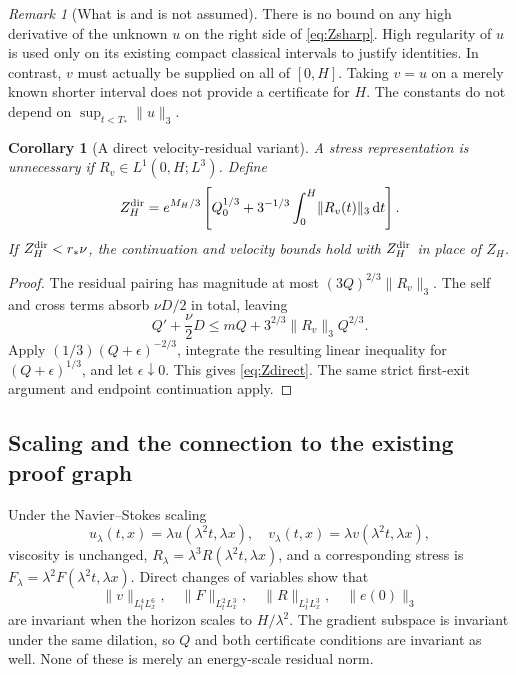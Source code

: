 \documentclass[11pt,a4paper]{article}
\newtheorem{corollary}[theorem]{Corollary}
\theoremstyle{definition}\newtheorem{definition}[theorem]{Definition}
\theoremstyle{remark}\newtheorem{remark}[theorem]{Remark}
\newcommand{\dd}{\,\mathrm d}
\newcommand{\norm}[1]{\lVert #1\rVert}
\newcommand{\rstar}{r_*}
\numberwithin{equation}{section}
\begin{document}
\begin{remark}[What is and is not assumed]
There is no bound on any high derivative of the unknown $u$ on the right side of \eqref{eq:Zsharp}. High regularity of $u$ is used only on its existing compact classical intervals to justify identities. In contrast, $v$ must actually be supplied on all of $[0,H]$. Taking $v=u$ on a merely known shorter interval does not provide a certificate for $H$. The constants do not depend on $\sup_{t<T_*}\norm u_3$.
\end{remark}

\begin{corollary}[A direct velocity-residual variant]\label{cor:direct}
A stress representation is unnecessary if $R_v\in L^1(0,H;L^3)$. Define
\begin{equation}\label{eq:Zdirect}
 Z_H^{\rm dir}=e^{M_H/3}\left[Q_0^{1/3}
             +3^{-1/3}\int_0^H\norm{R_v(t)}_3\dd t\right].
\end{equation}
If $Z_H^{\rm dir}<\rstar\nu$, the continuation and velocity bounds hold with $Z_H^{\rm dir}$ in place of $Z_H$.
\end{corollary}
\begin{proof}
The residual pairing has magnitude at most $(3Q)^{2/3}\norm{R_v}_3$. The self and cross terms absorb $\nu D/2$ in total, leaving
\[
 Q'+\frac\nu2D\le mQ+3^{2/3}\norm{R_v}_3Q^{2/3}.
\]
Apply $(1/3)(Q+\epsilon)^{-2/3}$, integrate the resulting linear inequality for $(Q+\epsilon)^{1/3}$, and let $\epsilon\downarrow0$. This gives \eqref{eq:Zdirect}. The same strict first-exit argument and endpoint continuation apply.
\end{proof}

\subsection{Scaling and the connection to the existing proof graph}
Under the Navier--Stokes scaling
\[
 u_\lambda(t,x)=\lambda u(\lambda^2t,\lambda x),\quad
 v_\lambda(t,x)=\lambda v(\lambda^2t,\lambda x),
\]
viscosity is unchanged, $R_\lambda=\lambda^3R(\lambda^2t,\lambda x)$, and a corresponding stress is $F_\lambda=\lambda^2F(\lambda^2t,\lambda x)$. Direct changes of variables show that
\begin{equation}\label{eq:criticalspaces}
 \norm v_{L^4_tL^6_x},\quad \norm F_{L^2_tL^3_x},\quad
 \norm R_{L^1_tL^3_x},\quad \norm{e(0)}_3
\end{equation}
are invariant when the horizon scales to $H/\lambda^2$. The gradient subspace is invariant under the same dilation, so $Q$ and both certificate conditions are invariant as well. None of these is merely an energy-scale residual norm.
\end{document}
